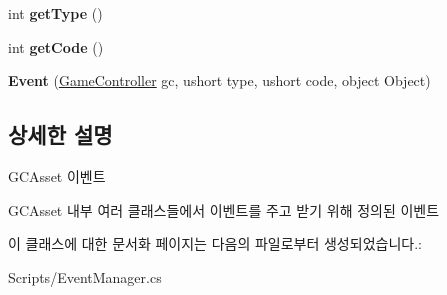 \begin{DoxyCompactItemize}
\item 
\hypertarget{class_event_manager_1_1_event_a2f784c90574c5a38a368ef54f5608c6f}{}int {\bfseries get\+Type} ()\label{class_event_manager_1_1_event_a2f784c90574c5a38a368ef54f5608c6f}

\item 
\hypertarget{class_event_manager_1_1_event_a3ab2d15f757b446834086ef045944d95}{}int {\bfseries get\+Code} ()\label{class_event_manager_1_1_event_a3ab2d15f757b446834086ef045944d95}

\item 
\hypertarget{class_event_manager_1_1_event_add1157dbe3d2939aa9ba5fbcf42cf14c}{}{\bfseries Event} (\hyperlink{class_game_controller}{Game\+Controller} gc, ushort type, ushort code, object Object)\label{class_event_manager_1_1_event_add1157dbe3d2939aa9ba5fbcf42cf14c}

\end{DoxyCompactItemize}


\subsection{상세한 설명}
G\+C\+Asset 이벤트

G\+C\+Asset 내부 여러 클래스들에서 이벤트를 주고 받기 위해 정의된 이벤트 

이 클래스에 대한 문서화 페이지는 다음의 파일로부터 생성되었습니다.\+:\begin{DoxyCompactItemize}
\item 
Scripts/Event\+Manager.\+cs\end{DoxyCompactItemize}
